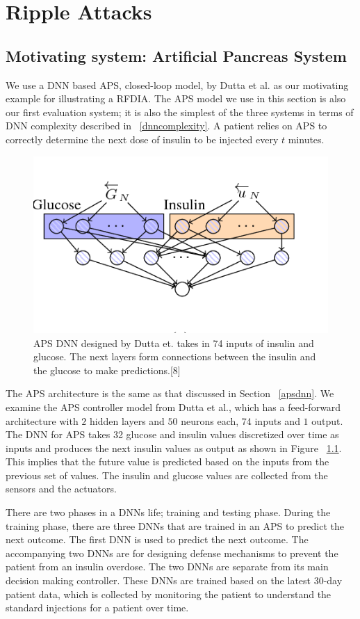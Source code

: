 \chapter{Ripple Attacks}
\label{attack}

\section{Motivating system: Artificial Pancreas System}


We use a DNN based \ac{APS}, closed-loop model, by Dutta et al. \cite{10.1007/978-3-319-99429-1_11}  as our motivating example for illustrating a \ac{RFDIA}. 
The \ac{APS} model we use in this section is also our first evaluation system; it is also the simplest of the three systems in terms of \ac{DNN} complexity described in ~\ref{dnncomplexity}.
A patient relies on  \ac{APS} to correctly determine the next dose of insulin to be injected every $t$ minutes. 

\begin{figure}
	\centering
	\includegraphics[width=0.7\linewidth, height=0.3\linewidth]{Images/APSDNN}
	\caption[APS DNN]{APS DNN designed by Dutta et. takes in 74 inputs of insulin and glucose. The next layers form connections between the insulin and the glucose to make predictions.[8]}
	\label{fig:apsdnn}
\end{figure}

The APS architecture is  the same as that discussed in Section ~\ref{apsdnn}. 
We examine the \ac{APS} controller model from Dutta et al., which has a feed-forward architecture with $2$ hidden layers and $50$ neurons each, 74 inputs and $1$ output. 
The DNN for APS takes 32 glucose and insulin values discretized over time as inputs and produces the next insulin values as output as shown in Figure ~\ref{fig:apsdnn}. 
 This implies that the future value is predicted based on the inputs from the previous set of values. 
The insulin and glucose values are collected from the sensors and the actuators. 



There are two phases in a \ac{DNN}s life; training and testing phase. 
During the training phase, there are three \ac{DNN}s that are trained in an \ac{APS} to predict the next outcome. 
The first \ac{DNN} is used to predict the next outcome. 
The accompanying two \ac{DNN}s are for designing defense mechanisms to prevent the patient from an insulin overdose.  
The two \ac{DNN}s are separate from its main decision making controller. 
These \ac{DNN}s are trained based on the latest 30-day patient data, which is collected by monitoring the patient to understand the standard injections for a patient over time. 


